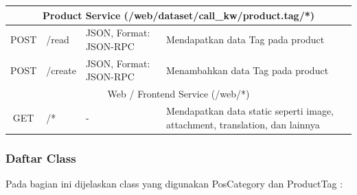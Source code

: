 \begin{small}
\begin{longtable}{|c|p{3cm}|p{3cm}|p{6cm}|}
	\multicolumn{4}{|c|}{Product Service (/web/dataset/call\_kw/product.tag/*)} \\
	\hline
	POST & /read & JSON, Format: JSON-RPC & Mendapatkan data Tag pada product\\
	\hline
	POST & /create & JSON, Format: JSON-RPC & Menambahkan  data Tag pada product \\
	\hline
	
	\multicolumn{4}{|c|}{Web / Frontend Service (/web/*)} \\
	\hline
	GET & /* & - & Mendapatkan data static seperti image, attachment, translation, dan lainnya  \\
	\hline
	
	\end{longtable}
	\end{small}
\endgroup


\subsubsection{ Daftar Class}
Pada bagian ini dijelaskan class yang digunakan PosCategory dan ProductTag :


